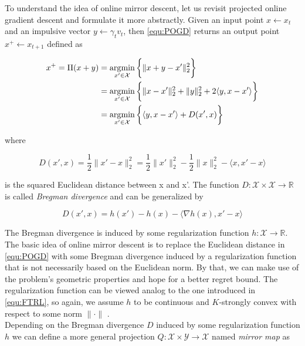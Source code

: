 To understand the idea of online mirror descent, let us revisit projected online gradient descent and formulate it more abstractly. Given an input point $x \gets x_t$ and an impulsive vector $y \gets \gamma_t v_t$, then \ref{equ:POGD} returns an output point $x^+ \gets x_{t+1}$ defined as

\begin{equation}
\begin{split}
x^+ = \Pi(x + y) & = \operatorname*{\arg\!\min}_{x' \in \mathcal{X}}\bigg\{\|x + y - x'\|_2^2\bigg\} \\
 & = \operatorname*{\arg\!\min}_{x' \in \mathcal{X}}\bigg\{\|x - x'\|_2^2 + \|y\|_2^2 + 2\langle y,x-x'\rangle\bigg\} \\
 & = \operatorname*{\arg\!\min}_{x' \in \mathcal{X}}\bigg\{\langle y,x-x'\rangle + D(x',x)\bigg\}
\end{split}
\label{equ:EuclideanProj}
\end{equation}

where 

\begin{equation*}
    D(x',x) = \frac{1}{2}\|x'-x\|_2^2 = \frac{1}{2}\|x'\|_2^2 - \frac{1}{2}\|x\|_2^2 - \langle x,x'-x\rangle
\end{equation*}

is the squared Euclidean distance between x and x'. The function $D: \mathcal{X}\times\mathcal{X} \to \mathbb{R}$ is called \textit{Bregman divergence} and can be generalized by 

\begin{equation*}
    D(x',x) = h(x') - h(x) - \langle\nabla h(x), x'-x\rangle
\end{equation*}

The Bregman divergence is induced by some regularization function $h: \mathcal{X} \to \mathbb{R}$. The basic idea of online mirror descent is to replace the Euclidean distance in \ref{equ:POGD} with some Bregman divergence induced by a regularization function that is not necessarily based on the Euclidean norm. By that, we can make use of the problem's geometric properties and hope for a better regret bound. The regularization function can be viewed analog to the one introduced in \ref{equ:FTRL}, so again, we assume $h$ to be continuous and $K$-strongly convex with respect to some norm $\|\cdot\|$ \cite{HDRmertikopoulos}. \\

Depending on the Bregman divergence $D$ induced by some regularization function $h$ we can define a more general projection $Q:\mathcal{X}\times\mathcal{Y} \to \mathcal{X}$ named \textit{mirror map} as 

